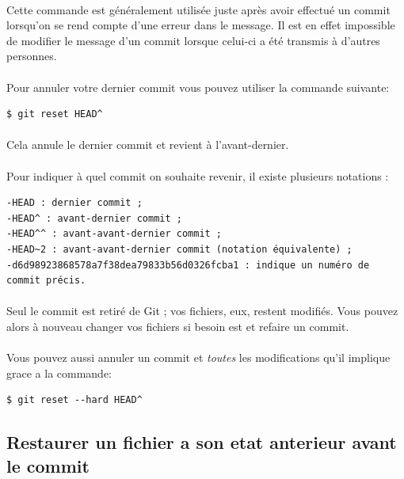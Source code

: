 \documentclass[french, a4paper, 12pt, titlepage]{article}
\begin{document}
\paragraph{}Cette commande est généralement utilisée juste après avoir effectué un commit lorsqu’on se rend compte d’une erreur dans le message. Il est en effet impossible de modifier le message d’un commit lorsque celui-ci a été transmis à d’autres personnes.
\paragraph{}Pour annuler votre dernier commit vous pouvez utiliser la commande suivante:
\begin{lstlisting}
$ git reset HEAD^
\end{lstlisting}
\paragraph{}Cela annule le dernier commit et revient à l’avant-dernier.
\paragraph{}Pour indiquer à quel commit on souhaite revenir, il existe plusieurs notations :
\begin{lstlisting}
-HEAD : dernier commit ;
-HEAD^ : avant-dernier commit ;
-HEAD^^ : avant-avant-dernier commit ;
-HEAD~2 : avant-avant-dernier commit (notation équivalente) ;
-d6d98923868578a7f38dea79833b56d0326fcba1 : indique un numéro de commit précis.
\end{lstlisting}
\paragraph{}Seul le commit est retiré de Git ; vos fichiers, eux, restent modifiés. Vous pouvez alors à nouveau changer vos fichiers si besoin est et refaire un commit.
\paragraph{}Vous pouvez aussi annuler un commit et \emph{toutes} les modifications qu'il implique grace a la commande:
\begin{lstlisting}
$ git reset --hard HEAD^
\end{lstlisting}

\subsection{Restaurer un fichier a son etat anterieur avant le commit}
\end{document}
